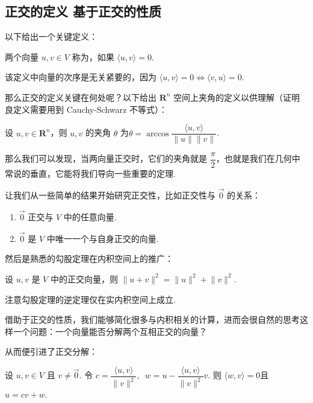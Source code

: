 \subsection{正交的定义 \quad 基于正交的性质}

以下给出一个关键定义：

\begin{definition}{}{}
    两个向量 $u, v \in V$ 称为，如果 $\langle u, v\rangle = 0$.
\end{definition}

该定义中向量的次序是无关紧要的，因为 $\langle u, v\rangle = 0 \iff \langle v, u\rangle = 0$.

那么正交的定义关键在何处呢？以下给出 $\mathbf{R}^{n}$ 空间上夹角的定义以供理解（证明良定义需要用到 Cauchy-Schwarz 不等式）：

\begin{definition}{}{}
    设 $u, v \in \mathbf{R}^{n}$，则 $u, v$ 的夹角 $ \theta $ 为$ \theta = \arccos \dfrac{\langle u, v\rangle}{\lVert u \rVert \lVert v \rVert}$.
\end{definition}

那么我们可以发现，当两向量正交时，它们的夹角就是 $\dfrac{\pi}{2}$，也就是我们在几何中常说的垂直，它能将我们导向一些重要的定理.

让我们从一些简单的结果开始研究正交性，比如正交性与 $ \vec{0} $ 的关系：

\begin{enumerate}
    \item $ \vec{0} $ 正交与 $V$ 中的任意向量.

    \item $ \vec{0} $ 是 $V$ 中唯一一个与自身正交的向量.
\end{enumerate}

然后是熟悉的勾股定理在内积空间上的推广：

\begin{theorem}{}{}
    设 $u, v$ 是 $V$ 中的正交向量，则 $\lVert u + v \rVert^2 = \lVert u \rVert^2 + \lVert v \rVert^2 $.
\end{theorem}

注意勾股定理的逆定理仅在实内积空间上成立.

借助于正交的性质，我们能够简化很多与内积相关的计算，进而会很自然的思考这样一个问题：一个向量能否分解两个互相正交的向量？

从而便引进了正交分解：

\begin{theorem}{}{}
    设 $u, v \in V$ 且 $v \neq \vec{0}$. 令 $ c = \dfrac{\langle u, v\rangle}{\lVert v \rVert^2}, \enspace w = u - \dfrac{\langle u, v\rangle}{\lVert v \rVert^2}v$. 则 $\langle w, v\rangle = 0$且 $u = cv + w$.
\end{theorem}

